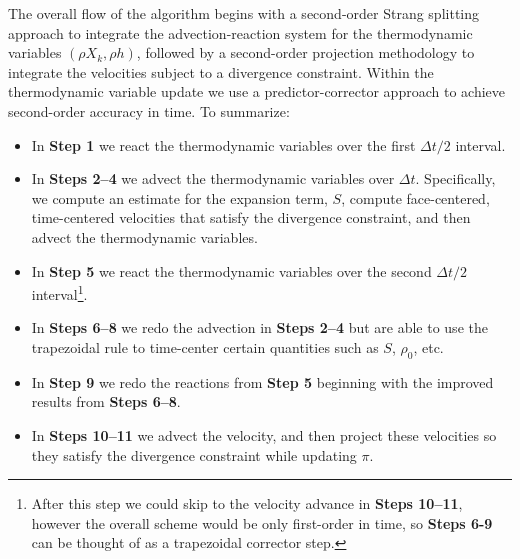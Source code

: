 The overall flow of the algorithm begins with a second-order Strang splitting approach to integrate the advection-reaction system for 
the thermodynamic variables $(\rho X_k, \rho h)$, followed by a second-order projection methodology to integrate the velocities subject to a divergence constraint.  Within the thermodynamic variable update we use a predictor-corrector approach to achieve second-order accuracy in time.
To summarize:
\begin{itemize}
\item In {\bf Step 1} we react the thermodynamic variables over the first $\Delta t/2$ interval.
\item In {\bf Steps 2--4} we advect the thermodynamic variables over $\Delta t$.  Specifically, we compute an estimate for the expansion term, $S$, compute face-centered, time-centered velocities that satisfy the divergence constraint, and then advect the thermodynamic variables.
\item In {\bf Step 5} we react the thermodynamic variables over the second $\Delta t/2$ interval\footnote{After this step we could skip to the velocity advance in {\bf Steps 10--11}, however the overall scheme would be only first-order in time, so {\bf Steps 6-9} can be thought of as a trapezoidal corrector step.}.
\item In {\bf Steps 6--8} we redo the advection in {\bf Steps 2--4} but are able to use the trapezoidal rule to time-center certain quantities such as $S$, $\rho_0$, etc.
\item In {\bf Step 9} we redo the reactions from {\bf Step 5} beginning with the improved results from {\bf Steps 6--8}.
\item In {\bf Steps 10--11} we advect the velocity, and then project these velocities so they satisfy the divergence constraint while updating $\pi$.
\end{itemize}

